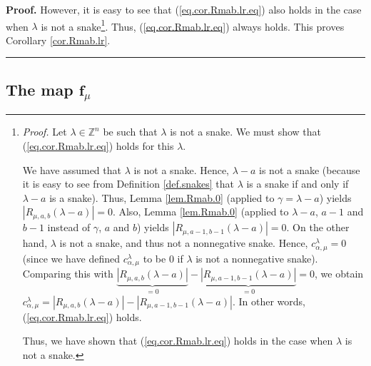 \documentclass[numbers=enddot,12pt,final,onecolumn,notitlepage]{scrartcl}%
\theoremstyle{definition}
\newenvironment{proof}[1][Proof]{\noindent\textbf{#1.} }{\ \rule{0.5em}{0.5em}}
\begin{document}
\begin{proof}
However, it is easy to see that (\ref{eq.cor.Rmab.lr.eq}) also holds in the
case when $\lambda$ is not a snake\footnote{\textit{Proof.} Let $\lambda
\in\mathbb{Z}^{n}$ be such that $\lambda$ is not a snake. We must show that
(\ref{eq.cor.Rmab.lr.eq}) holds for this $\lambda$.
\par
We have assumed that $\lambda$ is not a snake. Hence, $\lambda-a$ is not a
snake (because it is easy to see from Definition \ref{def.snakes} that
$\lambda$ is a snake if and only if $\lambda-a$ is a snake). Thus, Lemma
\ref{lem.Rmab.0} (applied to $\gamma=\lambda-a$) yields $\left\vert
R_{\mu,a,b}\left(  \lambda-a\right)  \right\vert =0$. Also, Lemma
\ref{lem.Rmab.0} (applied to $\lambda-a$, $a-1$ and $b-1$ instead of $\gamma$,
$a$ and $b$) yields $\left\vert R_{\mu,a-1,b-1}\left(  \lambda-a\right)
\right\vert =0$. On the other hand, $\lambda$ is not a snake, and thus not a
nonnegative snake. Hence, $c_{\alpha,\mu}^{\lambda}=0$ (since we have defined
$c_{\alpha,\mu}^{\lambda}$ to be $0$ if $\lambda$ is not a nonnegative snake).
Comparing this with $\underbrace{\left\vert R_{\mu,a,b}\left(  \lambda
-a\right)  \right\vert }_{=0}-\underbrace{\left\vert R_{\mu,a-1,b-1}\left(
\lambda-a\right)  \right\vert }_{=0}=0$, we obtain $c_{\alpha,\mu}^{\lambda
}=\left\vert R_{\mu,a,b}\left(  \lambda-a\right)  \right\vert -\left\vert
R_{\mu,a-1,b-1}\left(  \lambda-a\right)  \right\vert $. In other words,
(\ref{eq.cor.Rmab.lr.eq}) holds.
\par
Thus, we have shown that (\ref{eq.cor.Rmab.lr.eq}) holds in the case when
$\lambda$ is not a snake.}. Thus, (\ref{eq.cor.Rmab.lr.eq}) always holds. This
proves Corollary \ref{cor.Rmab.lr}.
\end{proof}

\subsection{\label{subsect.fF}The map $\mathbf{f}_{\mu}$}
\end{document}
